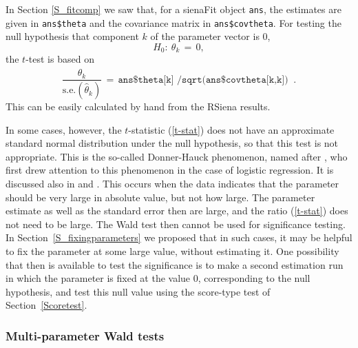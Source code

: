 \documentclass[a4paper,fleqn,11pt]{article}
\newcommand{\+}{\, + \,}
\newcommand{\se}{\mbox{s.e.}}
\newcommand{\RS}{{\sf RSiena }}
\begin{document}
In Section \ref{S_fitcomp} we saw that, for a \textsf{sienaFit}
object \texttt{ans}, the estimates are given in
\texttt{ans\$theta} and the covariance matrix in \texttt{ans\$covtheta}.
For testing the null hypothesis that component $k$ of the parameter
vector is 0,
\[
H_0 : \ \theta_k \,=\, 0 ,
\]
the $t$-test is based on
\begin{equation}
\frac{\hat\theta_k}{\se(\hat\theta_k)} \,=\,
   \texttt{ans\$theta[k] /sqrt(ans\$covtheta[k,k]) } \ .  \label{t-stat}
\end{equation}
This can be easily calculated by hand from the \RS results.
\medskip

In some cases, however, the $t$-statistic (\ref{t-stat}) does not have
an approximate standard normal distribution under the null hypothesis,
so that this test is not appropriate.
This is the so-called Donner-Hauck phenomenon, named after
\citet{HauckDonner77}, who first drew attention to this phenomenon
in the case of logistic regression. It is discussed also in
\citet[section 1.6]{GeyerThompson92} and \citet{AlbertAnderson84}.
This occurs when the data indicates that the parameter
should be very large in absolute value, but not how large.
The parameter estimate as well as the standard error then are large,
and the ratio (\ref{t-stat}) does not need to be large.
The Wald test then cannot be used for significance testing.
In Section~\ref{S_fixingparameters} we proposed that in such cases,
it may be helpful to fix the parameter at some large value,
without estimating it.
One possibility that then is available to test the significance
is to make a second estimation run in which the parameter is fixed at
the value 0, corresponding to the null hypothesis, and test
this null value using the score-type test of Section~\ref{Scoretest}.

\subsubsection*{Multi-parameter Wald tests}
\end{document}

